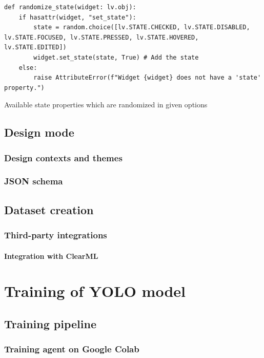 \documentclass[Bachelor, BIC, english, fhCitStyle, IEEE]{BASE/twbook} %
\newcommand{\nocontentsline}[3]{}
\newcommand{\hidsubsubsection}[1]{\bgroup\let\addcontentsline=\nocontentsline\subsubsection{#1}\egroup}
\begin{document}
\begin{listing}[htbp]
    \begin{verbatim}
def randomize_state(widget: lv.obj):
    if hasattr(widget, "set_state"):
        state = random.choice([lv.STATE.CHECKED, lv.STATE.DISABLED, lv.STATE.FOCUSED, lv.STATE.PRESSED, lv.STATE.HOVERED, lv.STATE.EDITED])
        widget.set_state(state, True) # Add the state
    else:
        raise AttributeError(f"Widget {widget} does not have a 'state' property.")
    \end{verbatim}
    \caption{Available state properties which are randomized in given options}
    \label{code:randomized-state}
\end{listing}
\clearpage
\section{Design mode}
\subsection{Design contexts and themes}
\subsection{JSON schema}
\section{Dataset creation}
\subsection{Third-party integrations} %
\hidsubsubsection{Integration with ClearML}
\hidsubsubsection{Integration with LLM (gpt-4-turbo)}
\clearpage
\chapter{Training of YOLO model}
\section{Training pipeline}
\subsection{Training agent on Google Colab}
\end{document}
